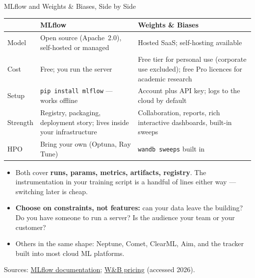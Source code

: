 \begin{frame}{MLflow and Weights \& Biases, Side by Side}

    \centering
    \renewcommand{\arraystretch}{1.3}
    {\scriptsize
    \begin{tabular}{p{2.9cm}|p{4.2cm}|p{4.2cm}}
        \toprule
                        & \textbf{MLflow} & \textbf{Weights \& Biases} \\
        \midrule
        Model           & Open source (Apache~2.0), self-hosted or managed & Hosted SaaS;
                          self-hosting available \\
        Cost            & Free; you run the server & Free tier for personal use (corporate use excluded);
                          free Pro licences for academic research \\
        Setup           & \texttt{pip install mlflow} --- works offline & Account plus API key; logs to the cloud
                          by default \\
        Strength        & Registry, packaging, deployment story; lives inside your infrastructure &
                          Collaboration, reports, rich interactive dashboards, built-in sweeps \\
        HPO             & Bring your own (Optuna, Ray Tune) & \texttt{wandb sweeps} built in \\
        \bottomrule
    \end{tabular}}

    \vspace{0.24em}
    \begin{itemize}
        \scriptsize
        \item Both cover \textbf{runs, params, metrics, artifacts, registry}. The instrumentation in your
              training script is a handful of lines either way --- switching later is cheap.
        \item \textbf{Choose on constraints, not features:} can your data leave the building? Do you have
              someone to run a server? Is the audience your team or your customer?
        \item Others in the same shape: Neptune, Comet, ClearML, Aim, and the tracker built into most cloud
              ML platforms.
    \end{itemize}

    \vspace{0.09em}
    {\scriptsize Sources: \href{https://mlflow.org/docs/latest/}{MLflow documentation};
    \href{https://wandb.ai/site/pricing/}{W\&B pricing} (accessed 2026).}

\end{frame}

